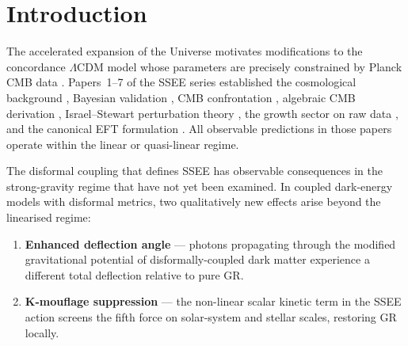 \documentclass[12pt,a4paper]{article}
\begin{document}
\clearpage
{\small\tableofcontents}
\clearpage

\section{Introduction}
\label{sec:intro}

The accelerated expansion of the Universe \citep{Riess1998,Perlmutter1999}
motivates modifications to the concordance $\Lambda$CDM model whose
parameters are precisely constrained by Planck CMB data \citep{Planck2018}.
Papers~1--7 of the SSEE series established the cosmological background
\citep{ssee_paper1}, Bayesian validation \citep{ssee_paper2}, CMB
confrontation \citep{ssee_paper3}, algebraic CMB derivation
\citep{ssee_paper4}, Israel--Stewart perturbation theory
\citep{ssee_paper5}, the growth sector on raw data \citep{ssee_paper6},
and the canonical EFT formulation \citep{ssee_paper7}.
All observable predictions in those papers operate within the linear or
quasi-linear regime.

The disformal coupling that defines SSEE has observable consequences in
the strong-gravity regime that have not yet been examined.
In coupled dark-energy models with disformal metrics, two qualitatively
new effects arise beyond the linearised regime:
\begin{enumerate}
  \item \textbf{Enhanced deflection angle} --- photons propagating through the
        modified gravitational potential of disformally-coupled dark matter
        experience a different total deflection relative to pure GR.
  \item \textbf{K-mouflage suppression} --- the non-linear scalar kinetic term
        in the SSEE action screens the fifth force on solar-system and
        stellar scales, restoring GR locally.
\end{enumerate}
\end{document}
